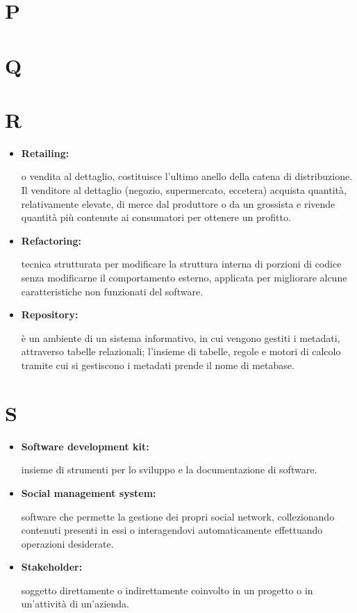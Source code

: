\section*{P}

\section*{Q}

\section*{R}

\begin{itemize}
	\item \hypertarget{ret}{\textbf{Retailing:}} o vendita al dettaglio, costituisce l'ultimo anello della catena di distribuzione. Il venditore al dettaglio (negozio, supermercato, eccetera) acquista quantità, relativamente elevate, di merce dal produttore o da un grossista e rivende quantità più contenute ai consumatori per ottenere un profitto.
\end{itemize}

\begin{itemize}
	\item \hypertarget{ref}{\textbf{Refactoring:}} tecnica strutturata per modificare la struttura interna di porzioni di codice senza modificarne il comportamento esterno, applicata per migliorare alcune caratteristiche non funzionati del software.
	
	\item \hypertarget{rep}{\textbf{Repository:}} è un ambiente di un sistema informativo, in cui vengono gestiti i metadati, attraverso tabelle relazionali; l'insieme di tabelle, regole e motori di calcolo tramite cui si gestiscono i metadati prende il nome di metabase.
	
\end{itemize}

\section*{S}

\begin{itemize}
	\item \hypertarget{sdk}{\textbf{Software development kit:}}  insieme di strumenti per lo sviluppo e la documentazione di software.
	
	\item \hypertarget{sms}{\textbf{Social management system:}} software che permette la gestione dei propri social network, collezionando contenuti presenti in essi o interagendovi automaticamente effettuando operazioni desiderate.
	
	\item \hypertarget{sh}{\textbf{Stakeholder:}} soggetto direttamente o indirettamente coinvolto in un progetto o in un'attività di un'azienda.
\end{itemize}

